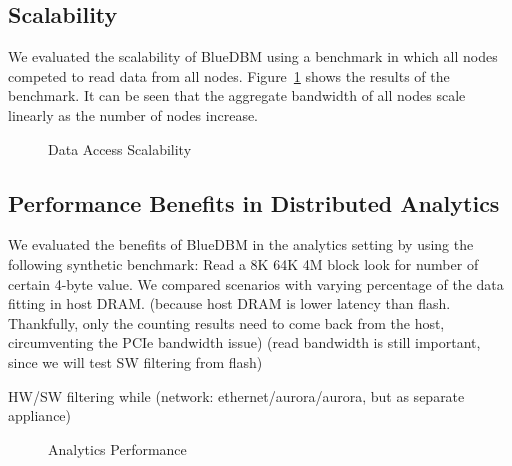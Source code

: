 \subsection{Scalability}

We evaluated the scalability of BlueDBM using a benchmark in which all nodes
competed to read data from all nodes. Figure~\ref{fig:result_scalability} shows
the results of the benchmark. It can be seen that the aggregate bandwidth of all
nodes scale linearly as the number of nodes increase.

\begin{figure}[h]
	\begin{center}
	\caption{Data Access Scalability}
	\label{fig:result_scalability}
	\end{center}
\end{figure}

%
%

\subsection{Performance Benefits in Distributed Analytics}

We evaluated the benefits of BlueDBM in the analytics setting by using the
following synthetic benchmark: Read a 8K 64K 4M block look for number of certain
4-byte value.
We compared scenarios with varying percentage of the data fitting in host DRAM.
(because host DRAM is lower latency than flash. Thankfully, only the counting
results need to come back from the host, circumventing the PCIe bandwidth issue)
(read bandwidth is still important, since we will test SW filtering from flash)

HW/SW filtering while (network: ethernet/aurora/aurora, but as separate
appliance)

\begin{figure}[h]
	\begin{center}
	\caption{Analytics Performance}
	\label{fig:result_analytics}
	\end{center}
\end{figure}
